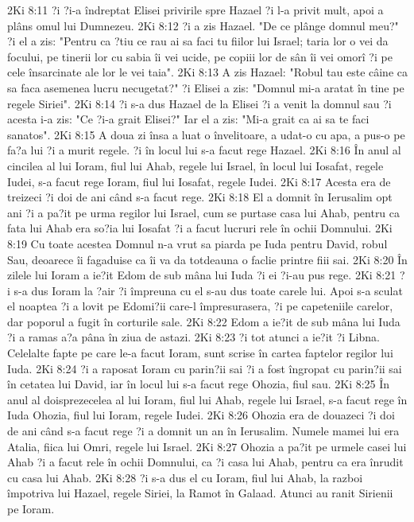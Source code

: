 2Ki 8:11  ?i ?i-a îndreptat Elisei privirile spre Hazael ?i l-a privit mult, apoi a plâns omul lui Dumnezeu.
2Ki 8:12  ?i a zis Hazael. "De ce plânge domnul meu?" ?i el a zis: "Pentru ca ?tiu ce rau ai sa faci tu fiilor lui Israel; taria lor o vei da focului, pe tinerii lor cu sabia îi vei ucide, pe copiii lor de sân îi vei omorî ?i pe cele însarcinate ale lor le vei taia".
2Ki 8:13  A zis Hazael: "Robul tau este câine ca sa faca asemenea lucru necugetat?" ?i Elisei a zis: "Domnul mi-a aratat în tine pe regele Siriei".
2Ki 8:14  ?i s-a dus Hazael de la Elisei ?i a venit la domnul sau ?i acesta i-a zis: "Ce ?i-a grait Elisei?" Iar el a zis: "Mi-a grait ca ai sa te faci sanatos".
2Ki 8:15  A doua zi însa a luat o învelitoare, a udat-o cu apa, a pus-o pe fa?a lui ?i a murit regele. ?i în locul lui s-a facut rege Hazael.
2Ki 8:16  În anul al cincilea al lui Ioram, fiul lui Ahab, regele lui Israel, în locul lui Iosafat, regele Iudei, s-a facut rege Ioram, fiul lui Iosafat, regele Iudei.
2Ki 8:17  Acesta era de treizeci ?i doi de ani când s-a facut rege.
2Ki 8:18  El a domnit în Ierusalim opt ani ?i a pa?it pe urma regilor lui Israel, cum se purtase casa lui Ahab, pentru ca fata lui Ahab era so?ia lui Iosafat ?i a facut lucruri rele în ochii Domnului.
2Ki 8:19  Cu toate acestea Domnul n-a vrut sa piarda pe Iuda pentru David, robul Sau, deoarece îi fagaduise ca îi va da totdeauna o faclie printre fiii sai.
2Ki 8:20  În zilele lui Ioram a ie?it Edom de sub mâna lui Iuda ?i ei ?i-au pus rege.
2Ki 8:21  ?i s-a dus Ioram la ?air ?i împreuna cu el s-au dus toate carele lui. Apoi s-a sculat el noaptea ?i a lovit pe Edomi?ii care-l împresurasera, ?i pe capeteniile carelor, dar poporul a fugit în corturile sale.
2Ki 8:22  Edom a ie?it de sub mâna lui Iuda ?i a ramas a?a pâna în ziua de astazi.
2Ki 8:23  ?i tot atunci a ie?it ?i Libna. Celelalte fapte pe care le-a facut Ioram, sunt scrise în cartea faptelor regilor lui Iuda.
2Ki 8:24  ?i a raposat Ioram cu parin?ii sai ?i a fost îngropat cu parin?ii sai în cetatea lui David, iar în locul lui s-a facut rege Ohozia, fiul sau.
2Ki 8:25  În anul al doisprezecelea al lui Ioram, fiul lui Ahab, regele lui Israel, s-a facut rege în Iuda Ohozia, fiul lui Ioram, regele Iudei.
2Ki 8:26  Ohozia era de douazeci ?i doi de ani când s-a facut rege ?i a domnit un an în Ierusalim. Numele mamei lui era Atalia, fiica lui Omri, regele lui Israel.
2Ki 8:27  Ohozia a pa?it pe urmele casei lui Ahab ?i a facut rele în ochii Domnului, ca ?i casa lui Ahab, pentru ca era înrudit cu casa lui Ahab.
2Ki 8:28  ?i s-a dus el cu Ioram, fiul lui Ahab, la razboi împotriva lui Hazael, regele Siriei, la Ramot în Galaad. Atunci au ranit Sirienii pe Ioram.
